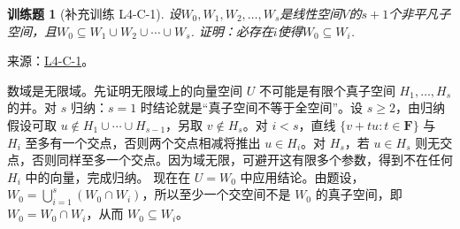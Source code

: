 \documentclass[12pt,fontset=fandol]{ctexart}
\newtheorem{exercise}{训练题}[section]
\begin{document}
\begin{exercise}[补充训练 L4-C-1]\label{prob:L4-C-1}
设$W_0,W_1,W_2,\ldots,W_s$是线性空间$V$的$s+1$个非平凡子空间，且$W_0 \subseteq W_1 \cup W_2 \cup \cdots \cup W_s$. 证明：必存在$i$使得$W_0\subseteq W_i$.
\end{exercise}
\noindent 来源：\href{https://github.com/yhwu-is/Linear-Algebra-Left-Undone/blob/new/%E8%AE%B2%E4%B9%89/%E4%B8%93%E9%A2%98/4%20%E7%BA%BF%E6%80%A7%E7%A9%BA%E9%97%B4%E7%9A%84%E8%BF%90%E7%AE%97.tex}{L4-C-1}。
\begin{solve}
数域是无限域。先证明无限域上的向量空间 $U$ 不可能是有限个真子空间 $H_1,\ldots,H_s$ 的并。对 $s$ 归纳：$s=1$ 时结论就是“真子空间不等于全空间”。设 $s\ge2$，由归纳假设可取 $u\notin H_1\cup\cdots\cup H_{s-1}$，另取 $v\notin H_s$。对 $i<s$，直线 $\{v+tu:t\in\mathbf F\}$ 与 $H_i$ 至多有一个交点，否则两个交点相减将推出 $u\in H_i$。对 $H_s$，若 $u\in H_s$ 则无交点，否则同样至多一个交点。因为域无限，可避开这有限多个参数，得到不在任何 $H_i$ 中的向量，完成归纳。
现在在 $U=W_0$ 中应用结论。由题设，$W_0=\bigcup_{i=1}^s(W_0\cap W_i)$，所以至少一个交空间不是 $W_0$ 的真子空间，即 $W_0=W_0\cap W_i$，从而 $W_0\subseteq W_i$。
\end{solve}
\end{document}

